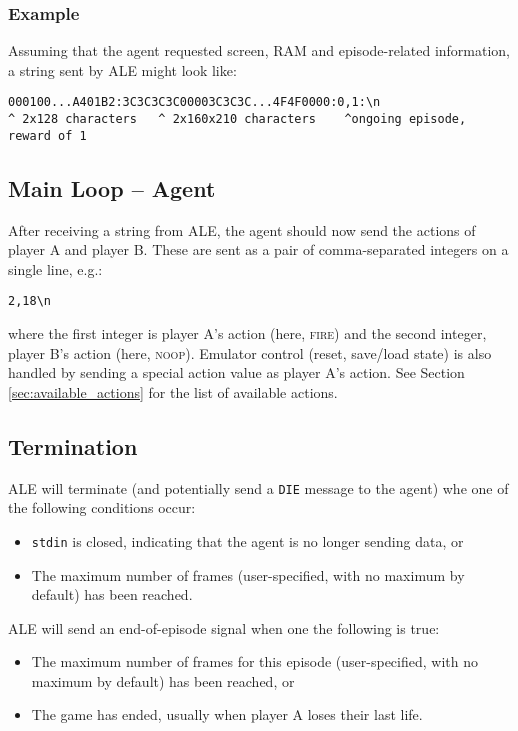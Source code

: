 \documentclass[12pt]{article}
\begin{document}
\subsubsection{Example}

Assuming that the agent requested screen, RAM and episode-related information, a string sent by ALE might look like:

\begin{verbatim}
000100...A401B2:3C3C3C3C00003C3C3C...4F4F0000:0,1:\n
^ 2x128 characters   ^ 2x160x210 characters    ^ongoing episode, reward of 1
\end{verbatim}

\subsection{Main Loop -- Agent}

After receiving a string from ALE, the agent should now send the actions of player A and player B.
These are sent as a pair of comma-separated integers on a single line, e.g.:

\begin{verbatim}
2,18\n
\end{verbatim}

where the first integer is player A's action (here, \textsc{fire}) and the second integer, player B's action (here, \textsc{noop}). Emulator control (reset, save/load state) is also handled by sending a special action value as player A's action. See Section \ref{sec:available_actions} for the list of available actions.

\subsection{Termination}\label{subsec:termination_conditions}

ALE will terminate (and potentially send a \verb+DIE+ message to the agent) whe one of the following conditions occur:

\begin{itemize}
  \item{\texttt{stdin} is closed, indicating that the agent is no longer sending data, or}
  \item{The maximum number of frames (user-specified, with no maximum by default) has been reached.}
\end{itemize}

ALE will send an end-of-episode signal when one the following is true:

\begin{itemize}
  \item{The maximum number of frames for this episode (user-specified, with no maximum by default) has been reached, or}
  \item{The game has ended, usually when player A loses their last life.}
\end{itemize}
\end{document}
